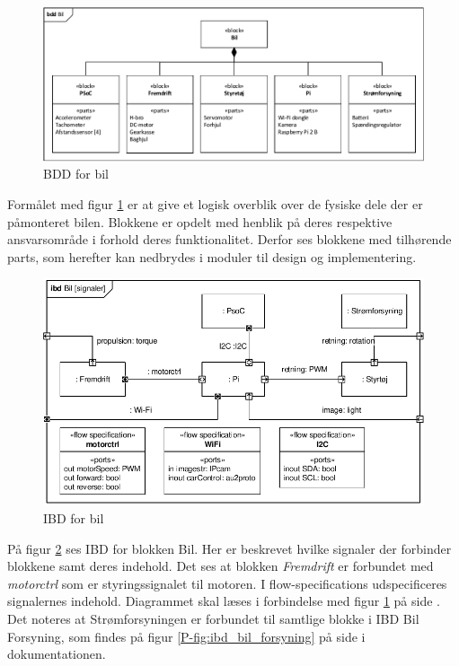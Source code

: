 \clearpage

\begin{landscape}

\begin{figure}
\centering
\includegraphics[width=\linewidth]{../fig/diagrammer/bil/bdd_bil.pdf}
\caption{BDD for bil}
\label{fig:bdd_bil}
\end{figure}
\end{landscape}

\clearpage

Formålet med figur \ref{fig:bdd_bil} er at give et logisk overblik over de fysiske dele der er påmonteret bilen. 
Blokkene er opdelt med henblik på deres respektive ansvarsområde i forhold deres funktionalitet. Derfor ses blokkene med tilhørende parts, som herefter kan nedbrydes i moduler til design og implementering.

\begin{figure}[H]
\centering
\includegraphics[width=\textwidth]{../fig/diagrammer/bil/ibd_bil.pdf}
\caption{IBD for bil}
\label{fig:ibd_bil}
\end{figure} 

På figur \ref{fig:ibd_bil} ses IBD for blokken Bil. 
Her er beskrevet hvilke signaler der forbinder blokkene samt deres indehold. 
Det ses at blokken \emph{Fremdrift} er forbundet med \emph{motorctrl} som er styringssignalet til motoren.  
I flow-specifications udspecificeres signalernes indehold. 
Diagrammet skal læses i forbindelse med figur \ref{fig:bdd_bil} på side \pageref{fig:bdd_bil}. 
Det noteres at Strømforsyningen er forbundet til samtlige blokke i IBD Bil Forsyning, som findes på figur \ref{P-fig:ibd_bil_forsyning} på side \pageref{P-fig:ibd_bil_forsyning} i dokumentationen.

\clearpage